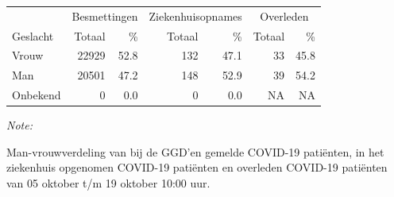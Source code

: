 \documentclass[
  english,
  man,floatsintext]{apa6}
\begin{document}
\begin{table}
\centering\begingroup\fontsize{11}{13}\selectfont

\begin{threeparttable}
\begin{tabular}{lrrrrrr}
\toprule
\multicolumn{1}{c}{ } & \multicolumn{2}{c}{Besmettingen} & \multicolumn{2}{c}{Ziekenhuisopnames} & \multicolumn{2}{c}{Overleden} \\
\cmidrule(l{3pt}r{3pt}){2-3} \cmidrule(l{3pt}r{3pt}){4-5} \cmidrule(l{3pt}r{3pt}){6-7}
Geslacht & Totaal & \% & Totaal & \% & Totaal & \%\\
\midrule
Vrouw & 22929 & 52.8 & 132 & 47.1 & 33 & 45.8\\
Man & 20501 & 47.2 & 148 & 52.9 & 39 & 54.2\\
Onbekend & 0 & 0.0 & 0 & 0.0 & NA & NA\\
\bottomrule
\end{tabular}
\begin{tablenotes}
\item \textit{Note: } 
\item Man-vrouwverdeling van bij de GGD’en gemelde COVID-19 patiënten, in het ziekenhuis opgenomen COVID-19 patiënten en overleden COVID-19 patiënten van 05 oktober t/m 19 oktober 10:00 uur.
\end{tablenotes}
\end{threeparttable}
\endgroup{}
\end{table}
\newpage
\end{document}
